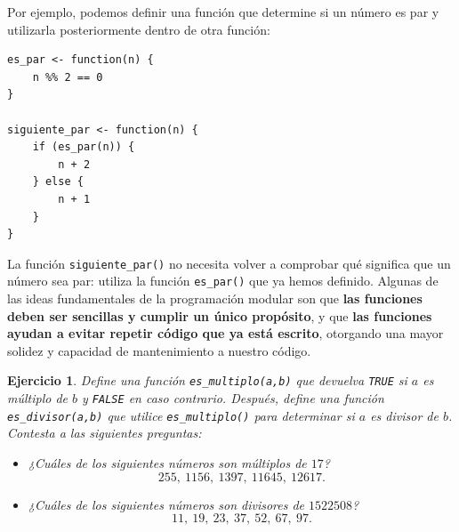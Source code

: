 \documentclass[11pt,a4paper]{article}
\theoremstyle{exercise}
\newtheorem{exercise}{Ejercicio}
\begin{document}
\medskip

Por ejemplo, podemos definir una función que determine si un número es par y utilizarla posteriormente dentro de otra función:
\begin{lstlisting}[style=rstyle]
es_par <- function(n) {
	n %% 2 == 0
}

siguiente_par <- function(n) {
	if (es_par(n)) { 
		n + 2 
	} else { 
		n + 1 
	} 
} 
\end{lstlisting}

\noindent La función \texttt{siguiente\_par()} no necesita volver a comprobar qué significa que un número sea par: utiliza la función \texttt{es\_par()} que ya hemos definido. Algunas de las ideas fundamentales de la programación modular son que \textbf{las funciones deben ser sencillas y cumplir un único propósito}, y que \textbf{las funciones ayudan a evitar repetir código que ya está escrito}, otorgando una mayor solidez y capacidad de mantenimiento a nuestro código.



\begin{exercise} Define una función \texttt{es\_multiplo(a,b)} que devuelva \texttt{TRUE} si $a$ es múltiplo de $b$ y \texttt{FALSE} en caso contrario. Después, define una función \texttt{es\_divisor(a,b)} que utilice \texttt{es\_multiplo()} para determinar si $a$ es divisor de $b$. Contesta a las siguientes preguntas:
\begin{itemize}
	\item ¿Cuáles de los siguientes números son múltiplos de $17$? 
	\[
		255,\ 1156,\ 1397,\ 11645,\ 12617.
	\]

	\item ¿Cuáles de los siguientes números son divisores de $1522508$? 
	\[
		11,\ 19,\ 23,\ 37,\ 52,\ 67,\ 97.
	\]	
\end{itemize} 
\end{exercise}



%
%
%
\end{document}
